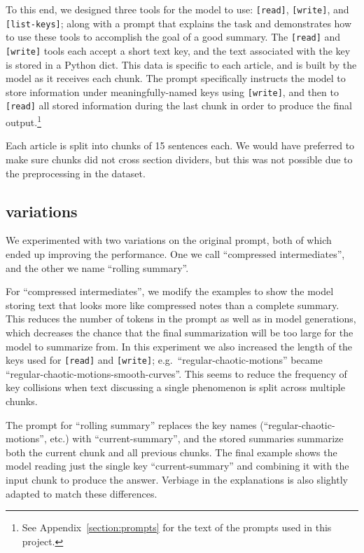 \documentclass{article}
\begin{document}
To this end, we designed three tools for the model to use: \texttt{[read]}, \texttt{[write]}, and \texttt{[list-keys]}; along with a prompt that explains the task and demonstrates how to use these tools to accomplish the goal of a good summary. The \texttt{[read]} and \texttt{[write]} tools each accept a short text key, and the text associated with the key is stored in a Python dict. This data is specific to each article, and is built by the model as it receives each chunk. The prompt specifically instructs the model to store information under meaningfully-named keys using \texttt{[write]}, and then to \texttt{[read]} all stored information during the last chunk in order to produce the final output.\footnote{See Appendix~\ref{section:prompts} for the text of the prompts used in this project.}

Each article is split into chunks of 15 sentences each. We would have preferred to make sure chunks did not cross section dividers, but this was not possible due to the preprocessing in the dataset.

\subsection{variations}

We experimented with two variations on the original prompt, both of which ended up improving the performance. One we call ``compressed intermediates'', and the other we name ``rolling summary''.

For ``compressed intermediates'', we modify the examples to show the model storing text that looks more like compressed notes than a complete summary. This reduces the number of tokens in the prompt as well as in model generations, which decreases the chance that the final summarization will be too large for the model to summarize from. In this experiment we also increased the length of the keys used for \texttt{[read]} and \texttt{[write]}; e.g.~``regular-chaotic-motions'' became ``regular-chaotic-motions-smooth-curves''. This seems to reduce the frequency of key collisions when text discussing a single phenomenon is split across multiple chunks.

The prompt for ``rolling summary'' replaces the key names (``regular-chaotic-motions'', etc.) with ``current-summary'', and the stored summaries summarize both the current chunk and all previous chunks. The final example shows the model reading just the single key ``current-summary'' and combining it with the input chunk to produce the answer. Verbiage in the explanations is also slightly adapted to match these differences.
\end{document}
